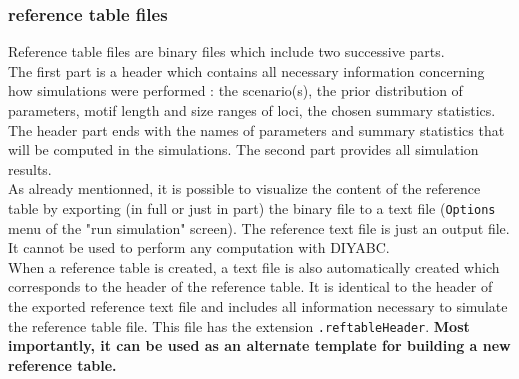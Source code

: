\subsubsection{reference table files} 
Reference table files are binary files which include two successive parts.\\ The first part is a header which contains all necessary information concerning how simulations were performed : the scenario(s), the prior distribution of parameters, motif length and size ranges of loci, the chosen summary statistics. The header part ends with the names of parameters and summary statistics that will be computed in the simulations. The second part provides all simulation results.\\
As already mentionned, it is possible to visualize the content of the reference table by exporting (in full or just in part) the binary file to a text file (\texttt{Options} menu of the "run simulation" screen). The reference  text file is just an output file. It cannot be used to perform any computation with DIYABC.\\
When a reference table is created, a text file is also automatically created which corresponds to the header of the reference table. It is identical to the header of the exported reference text file and includes all information necessary to simulate the reference table file. This file has the extension \texttt{.reftableHeader}. \textbf{Most importantly, it can be used as an alternate template for building a new reference table.}  
